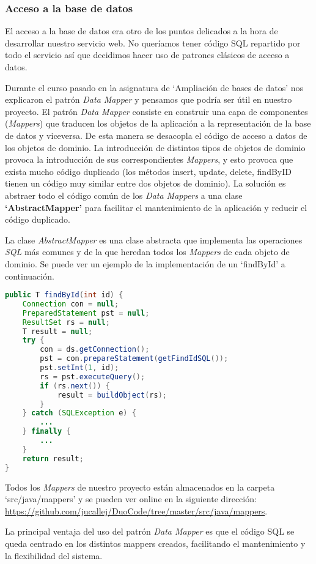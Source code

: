 \subsubsection{Acceso a la base de datos}

El acceso a la base de datos era otro de los puntos delicados a la hora de desarrollar nuestro servicio web. No queríamos tener código SQL repartido por todo el servicio así que decidimos hacer uso de patrones clásicos de acceso a datos.

Durante el curso pasado en la asignatura de `Ampliación de bases de datos' nos explicaron el patrón \textit{Data Mapper} y pensamos que podría ser útil en nuestro proyecto.
El patrón \textit{Data Mapper} consiste en construir una capa de componentes (\textit{Mappers}) que traducen los objetos de la aplicación a la representación de la base de datos y viceversa. De esta manera se desacopla el código de acceso a datos de los objetos de dominio.
La introducción de distintos tipos de objetos de dominio provoca la introducción de sus correspondientes \textit{Mappers}, y esto provoca que exista mucho código duplicado (los métodos insert, update, delete, findByID tienen un código muy similar entre dos objetos de dominio). La solución es abstraer todo el código común de los \textit{Data Mappers} a una clase \textbf{`AbstractMapper'} para facilitar el mantenimiento de la aplicación y reducir el código duplicado.

La clase \textit{AbstractMapper} es una clase abstracta que implementa las operaciones \textit{SQL} más comunes y de la que heredan todos los \textit{Mappers} de cada objeto de dominio. Se puede ver un ejemplo de la implementación de un `findById' a continuación.

\vspace{1em}
{\codesize
\lstset{}
\begin{lstlisting}[language=java, frame=single]
public T findById(int id) {
	Connection con = null;
	PreparedStatement pst = null;
	ResultSet rs = null;
	T result = null;
	try {
		con = ds.getConnection();
		pst = con.prepareStatement(getFindIdSQL());
		pst.setInt(1, id);
		rs = pst.executeQuery();
		if (rs.next()) {
			result = buildObject(rs);
		} 
	} catch (SQLException e) {
		... 
	} finally {
		... 
	}
	return result;
}
\end{lstlisting}
}
\vspace{1em}

Todos los \textit{Mappers} de nuestro proyecto están almacenados en la carpeta `src/java/mappers' y se pueden ver online en la siguiente dirección: \url{https://github.com/jucallej/DuoCode/tree/master/src/java/mappers}.

La principal ventaja del uso del patrón \textit{Data Mapper} es que el código SQL se queda centrado en los distintos mappers creados, facilitando el mantenimiento y la flexibilidad del sistema.